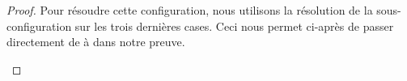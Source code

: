  \label{config-2-1}


\begin{proof}
    Pour résoudre cette configuration, nous utilisons la résolution de la sous-configuration  sur les trois dernières cases.
    Ceci nous permet ci-après  de passer directement de  à  dans notre preuve.
    \begin{mvts}
        \medskip
        \item  {}

        \medskip
        \item  {}

        \medskip
        \item  {}

        \medskip
        \item  {}
    \end{mvts}
\end{proof}
